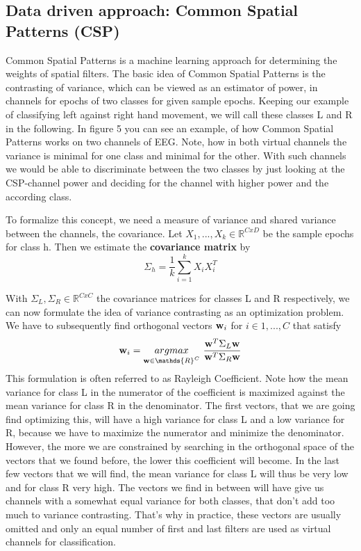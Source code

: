\documentclass[12pt,twoside,twocolumn]{article}
\begin{document}
\subsection{Data driven approach: Common Spatial Patterns (CSP)}
Common Spatial Patterns is a machine learning approach for determining the weights of spatial filters. The basic idea of Common Spatial Patterns is the contrasting of variance, which can be viewed as an estimator of power, in channels for epochs of two classes for given sample epochs. Keeping our example of classifying left against right hand movement, we will call these classes L and R in the following. In figure 5 you can see an example, of how Common Spatial Patterns works on two channels of EEG. Note, how in both virtual channels the variance is minimal for one class and minimal for the other. With such channels we would be able to discriminate between the two classes by just looking at the CSP-channel power and deciding for the channel with higher power and the according class. 

To formalize this concept, we need a measure of variance and shared variance between the channels, the covariance. Let $X_1, ..., X_k \in \mathds{R}^{CxD}$ be the sample epochs for class h. Then we estimate the {\bf covariance matrix} by
\begin{equation}
	\Sigma_h = \frac{1}{k} \sum_{i=1}^{k}X_i X_i^T
\end{equation}

With $\Sigma_{L}, \Sigma_{R} \in \mathds{R}^{CxC}$ the covariance matrices for classes L and R respectively, we can now formulate the idea of variance contrasting as an optimization problem. We have to subsequently find orthogonal vectors ${\bf w}_i$ for $i \in 1, ..., C $ that satisfy
\begin{equation}
		{\bf w}_i = \underset{{\bf w} \in \mathds{R}^{C}}{argmax}  \  \frac{{\bf w}^T \Sigma_{L} {\bf w}}{{\bf w}^T \Sigma_{R} {\bf w}}
\end{equation}
This formulation is often referred to as Rayleigh Coefficient. Note how the mean variance for class L in the numerator of the coefficient is maximized against the mean variance for class R in the denominator. The first vectors, that we are going find optimizing this, will have a high variance for class L and a low variance for R, because we have to maximize the numerator and minimize the denominator. However, the more we are constrained by searching in the orthogonal space of the vectors that we found before, the lower this coefficient will become. In the last few vectors that we will find, the mean variance for class L will thus be very low and for class R very high. The vectors we find in between will have give us channels with a somewhat equal variance for both classes, that don't add too much to variance contrasting. That's why in practice, these vectors are usually omitted and only an equal number of first and last filters are used as virtual channels for classification.
\end{document}
